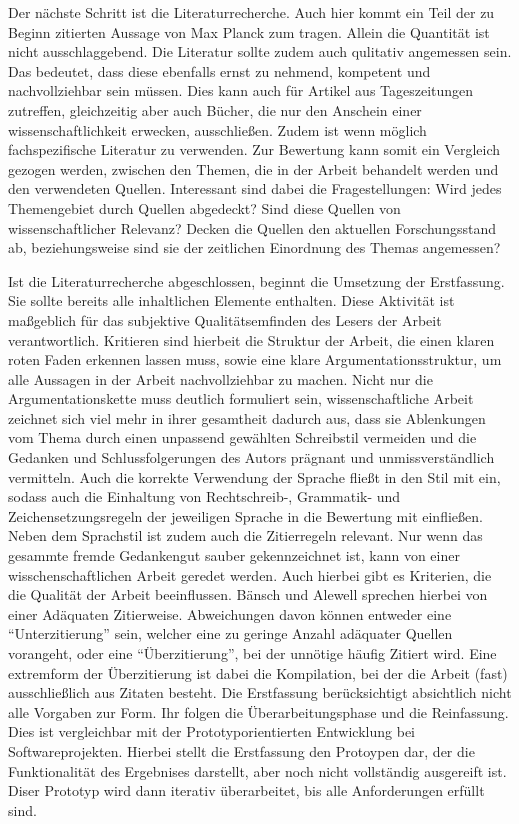 Der nächste Schritt ist die Literaturrecherche. Auch hier kommt ein Teil der zu Beginn zitierten Aussage von Max Planck zum tragen. Allein die Quantität ist nicht ausschlaggebend. Die Literatur sollte zudem auch qulitativ angemessen sein. Das bedeutet, dass diese ebenfalls ernst zu nehmend, kompetent und nachvollziehbar sein müssen. Dies kann auch für Artikel aus Tageszeitungen zutreffen, gleichzeitig aber auch Bücher, die nur den Anschein einer wissenschaftlichkeit erwecken, ausschließen. Zudem ist wenn möglich fachspezifische Literatur zu verwenden.\cite[Vgl.][S. 7 f.]{Baensch:2013} Zur Bewertung kann somit ein Vergleich gezogen werden, zwischen den Themen, die in der Arbeit behandelt werden und den verwendeten Quellen. Interessant sind dabei die Fragestellungen: Wird jedes Themengebiet durch Quellen abgedeckt? Sind diese Quellen von wissenschaftlicher Relevanz? Decken die Quellen den aktuellen Forschungsstand ab, beziehungsweise sind sie der zeitlichen Einordnung des Themas angemessen?

Ist die Literaturrecherche abgeschlossen, beginnt die Umsetzung der Erstfassung. Sie sollte bereits alle inhaltlichen Elemente enthalten. Diese Aktivität ist maßgeblich für das subjektive Qualitätsemfinden des Lesers der Arbeit verantwortlich. Kritieren sind hierbeit die Struktur der Arbeit, die einen klaren roten Faden erkennen lassen muss, sowie eine klare Argumentationsstruktur, um alle Aussagen in der Arbeit nachvollziehbar zu machen.\cite[Vgl.][S. 59]{Baensch:2013}
Nicht nur die Argumentationskette muss deutlich formuliert sein, wissenschaftliche Arbeit zeichnet sich viel mehr in ihrer gesamtheit dadurch aus, dass sie Ablenkungen vom Thema durch einen unpassend gewählten Schreibstil vermeiden und die Gedanken und Schlussfolgerungen des Autors prägnant und unmissverständlich vermitteln. Auch die korrekte Verwendung der Sprache fließt in den Stil mit ein, sodass auch die Einhaltung von Rechtschreib-, Grammatik- und Zeichensetzungsregeln der jeweiligen Sprache in die Bewertung mit einfließen.\cite[Vgl.][S. 25-27]{Baensch:2013} 
Neben dem Sprachstil ist zudem auch die Zitierregeln relevant. Nur wenn das gesammte fremde Gedankengut sauber gekennzeichnet ist, kann von einer wisschenschaftlichen Arbeit geredet werden. Auch hierbei gibt es Kriterien, die die Qualität der Arbeit beeinflussen. Bänsch und Alewell sprechen hierbei von einer Adäquaten Zitierweise. Abweichungen davon können entweder eine \enquote{Unterzitierung} sein, welcher eine zu geringe Anzahl adäquater Quellen vorangeht, oder eine \enquote{Überzitierung}, bei der unnötige häufig Zitiert wird. Eine extremform der Überzitierung ist dabei die Kompilation, bei der die Arbeit (fast) ausschließlich aus Zitaten besteht.\cite[Vgl.][S.11 f.]{Baensch:2013}
Die Erstfassung berücksichtigt absichtlich nicht alle Vorgaben zur Form. Ihr folgen die Überarbeitungsphase und die Reinfassung. Dies ist vergleichbar mit der Prototyporientierten Entwicklung bei Softwareprojekten. Hierbei stellt die Erstfassung den Protoypen dar, der die Funktionalität des Ergebnises darstellt, aber noch nicht vollständig ausgereift ist. Diser Prototyp wird dann iterativ überarbeitet, bis alle Anforderungen erfüllt sind.\cite[Vgl.][S. 363]{Liggesmeyer:2009}

